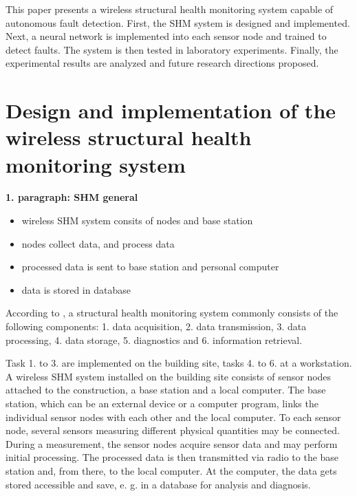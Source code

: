 \documentclass[12pt]{scrartcl}
\begin{document}

This paper presents a wireless structural health monitoring system capable of autonomous fault detection. 
First, the SHM system is designed and implemented. 
Next, a neural network is implemented into each sensor node and trained to detect faults. 
The system is then tested in laboratory experiments. 
Finally, the experimental results are analyzed and future research directions proposed.



\section*{Design and implementation of the wireless structural health monitoring system}

\textbf{1. paragraph: SHM general}

\begin{itemize}
\item wireless SHM system consits of nodes and base station
\item nodes collect data, and process data
\item processed data is sent to base station and personal computer
\item data is stored in database
\end{itemize}


According to \cite[5]{BisbySHM}, a structural health monitoring system commonly consists of the following components:
1. data acquisition,
2. data transmission, 
3. data processing,
4. data storage,
5. diagnostics and 
6. information retrieval.

Task 1. to 3. are implemented on the building site, tasks 4. to 6. at a workstation. 
A wireless SHM system installed on the building site consists of sensor nodes attached to the construction, a base station and a local computer. 
The base station, which can be an external device or a computer program, links the individual sensor nodes with each other and the local computer.
To each sensor node, several sensors measuring different physical quantities may be connected. 
During a measurement, the sensor nodes acquire sensor data and may perform initial processing.
The processed data is then transmitted via radio to the base station and, from there, to the local computer. 
At the computer, the data gets stored accessible and save, e. g. in a database for analysis and diagnosis.
\end{document}

